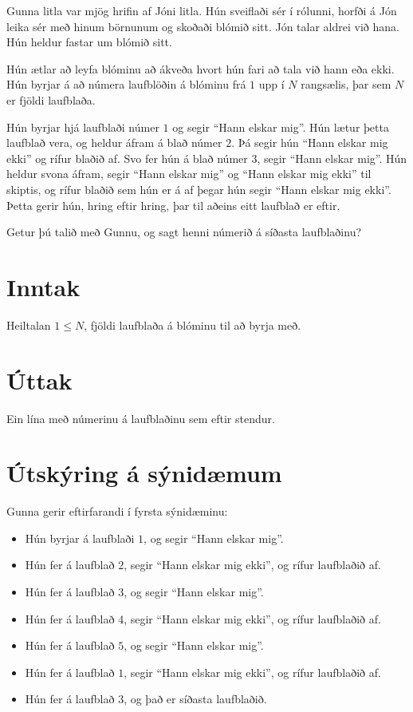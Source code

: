 Gunna litla var mjög hrifin af Jóni litla. Hún sveiflaði sér í rólunni, horfði á
Jón leika sér með hinum börnunum og skoðaði blómið sitt.
Jón talar aldrei við hana. Hún heldur fastar um blómið sitt.

Hún ætlar að leyfa blóminu að ákveða hvort hún fari að tala við hann eða ekki.
Hún byrjar á að númera laufblöðin á blóminu frá $1$ upp í $N$ rangsælis, þar
sem $N$ er fjöldi laufblaða.

Hún byrjar hjá laufblaði númer $1$ og segir ``Hann elskar mig''. Hún lætur
þetta laufblað vera, og heldur áfram á blað númer $2$. Þá segir hún ``Hann
elskar mig ekki'' og rífur blaðið af. Svo fer hún á blað númer $3$, segir
``Hann elskar mig''. Hún heldur svona áfram, segir ``Hann elskar mig'' og
``Hann elskar mig ekki'' til skiptis, og rífur blaðið sem hún er á af þegar
hún segir ``Hann elskar mig ekki''. Þetta gerir hún, hring eftir hring, þar til
aðeins eitt laufblað er eftir.

Getur þú talið með Gunnu, og sagt henni númerið á síðasta laufblaðinu?

\section*{Inntak}
Heiltalan $1 \leq N$, fjöldi laufblaða á blóminu til að byrja með.

\section*{Úttak}
Ein lína með númerinu á laufblaðinu sem eftir stendur.

\section*{Útskýring á sýnidæmum}
Gunna gerir eftirfarandi í fyrsta sýnidæminu:
\begin{itemize}
    \item Hún byrjar á laufblaði $1$, og segir ``Hann elskar mig''.
    \item Hún fer á laufblað $2$, segir ``Hann elskar mig ekki'', og rífur laufblaðið af.
    \item Hún fer á laufblað $3$, og segir ``Hann elskar mig''.
    \item Hún fer á laufblað $4$, segir ``Hann elskar mig ekki'', og rífur laufblaðið af.
    \item Hún fer á laufblað $5$, og segir ``Hann elskar mig''.
    \item Hún fer á laufblað $1$, segir ``Hann elskar mig ekki'', og rífur laufblaðið af.
    \item Hún fer á laufblað $3$, og það er síðasta laufblaðið.
\end{itemize}

